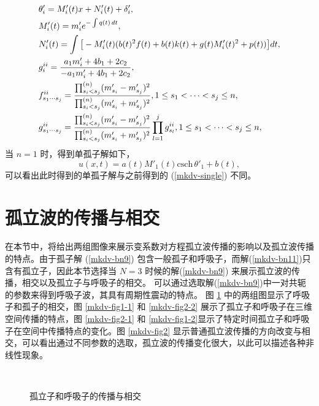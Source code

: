 \begin{align}
& \theta'_i=M'_i(t) x + N'_i(t) + \delta'_i,
\\ & M'_i(t)= m'_i e^{-\int q(t) \, dt},
\\  & N'_i(t)= \int \big[-M'_i(t) (b(t)^2 f(t)+b(t) k(t)+g(t) M'_i(t)^2+p(t))\big] dt,
\\ & g^{\uppercase\expandafter{\romannumeral 2}}_i =\frac{a_1 m'_i+4 b_1+2 c_2}{-a_1 m'_i +4 b_1+2 c_2},
\\ & f^{\uppercase\expandafter{\romannumeral 2}}_{s_1 \cdots s_{j}}=\frac{\prod_{s_i < s_j}^{(n)} (m'_{s_i}-m'_{s_j})^2  }{\prod_{s_i < s_j}^{(n)} (m'_{s_i}+m'_{s_j})^2} , 1 \leq s_1 < \cdots < s_{j} \leq n,
\\ & g^{\uppercase\expandafter{\romannumeral 2}}_{s_1 \cdots s_{j}}=\frac{\prod_{s_i < s_j}^{(n)} (m'_{s_i}-m'_{s_j})^2  }{\prod_{s_i < s_j}^{(n)} (m'_{s_i}+m'_{s_j})^2} \prod_{l=1}^{j} g^{\uppercase\expandafter{\romannumeral 2}}_{s_l}, 1 \leq s_1 < \cdots < s_{j} \leq n,
\end{align}
当 $n=1$ 时，得到单孤子解如下，
\begin{equation}
u(x,t)=a(t) M'_1(t)\text{csch} \,\theta'_1   +b(t), \label{mkdv-single2}
\end{equation}
可以看出此时得到的单孤子解与之前得到的 (\ref{mkdv-single}) 不同。


\section{孤立波的传播与相交}
在本节中，将给出两组图像来展示变系数对方程孤立波传播的影响以及孤立波传播的特点。由于孤子解 (\ref{mkdv-bn9}) 包含一般孤子和呼吸子，而解(\ref{mkdv-bn11})只含有孤立子，因此本节选择当 $N=3$ 时候的解(\ref{mkdv-bn9}) 来展示孤立波的传播，相交以及孤立子与呼吸子的相交。
可以通过选取解(\ref{mkdv-bn9})中一对共轭的参数来得到呼吸子波，其具有周期性震动的特点。
图 \ref{mkdv-fig1} 中的两组图显示了呼吸子和孤子的相交，图 \ref{mkdv-fig1-1} 和 \ref{mkdv-fig2-2} 展示了孤立子和呼吸子在三维空间传播的特点，图 \ref{mkdv-fig2-1} 和 \ref{mkdv-fig1-2}显示了特定时间孤立子和呼吸子在空间中传播特点的变化。图 \ref{mkdv-fig2} 显示普通孤立波传播的方向改变与相交，可以看出通过不同参数的选取，孤立波的传播变化很大，以此可以描述各种非线性现象。

\begin{figure}[!htp]
\centering

\qquad
{}
\\
\centering
{}
\qquad
{}

\caption{孤立子和呼吸子的传播与相交}
\label{mkdv-fig1}
\end{figure}


